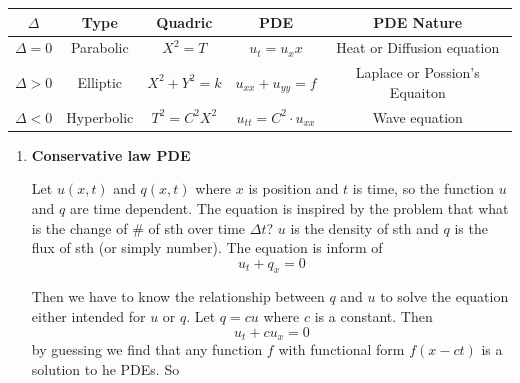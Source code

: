 \documentclass[10pt]{article}
\newenvironment{changemargin}[2]{%
  \begin{list}{}{%
    \setlength{\topsep}{0pt}%
    \setlength{\leftmargin}{#1}%
    \setlength{\rightmargin}{#2}%
    \setlength{\listparindent}{\parindent}%
    \setlength{\itemindent}{\parindent}%
    \setlength{\parsep}{\parskip}%
  }%
  \item[]}{\end{list}}
\begin{document}
\begin{changemargin}{-0.125in}{0in}
\begin{enumerate}
	            \bigskip
	            
	            \begin{center}
 \begin{tabular}{ |c|c|c|c|c| } 
 
 $\Delta$     & Type  & Quadric & PDE & PDE Nature\\
 \hline
 $\Delta = 0$ & Parabolic & $X^2 = T$ & $u_t = u_xx$ & Heat or Diffusion equation\\ 
 $\Delta > 0$ & Elliptic & $X^2 + Y^2 = k$ & $u_{xx} + u_{yy} = f$ & Laplace or Possion's Equaiton\\ 
 $\Delta < 0$ & Hyperbolic &$T^2 = C^2X^2$ & $u_{tt} = C^2\cdot u_{xx}$ & Wave equation \\ 
 
\end{tabular}
\end{center}            
	            
	            \bigskip
	            
	            
	            
	            \begin{enumerate}
	            
	            \item \textbf{Conservative law PDE}
	            
	            \smallskip
	            
	            Let $u(x,t)$ and $q(x,t)$ where $x$ is position and $t$ is time, so the function $u$ and $q$ are time dependent. The equation is inspired by the problem that what is the change of \# of sth over time $\Delta t$? $u$ is the density of sth and $q$ is the flux of sth (or simply number). The equation is inform of 
	            \[
	            u_t  + q_x = 0
	            \]
	            
	            Then we have to know the relationship between $q$ and $u$ to solve the equation either intended for $u$ or $q$. Let $q = cu$ where $c$ is a constant. Then 
	            \[
	            u_t + cu_x = 0
	            \]
	            by guessing we find that any function $f$ with functional form $f(x - ct)$ is a solution to he PDEs. So 
	            

\end{enumerate}
\end{enumerate}
\end{changemargin}
\end{document}
